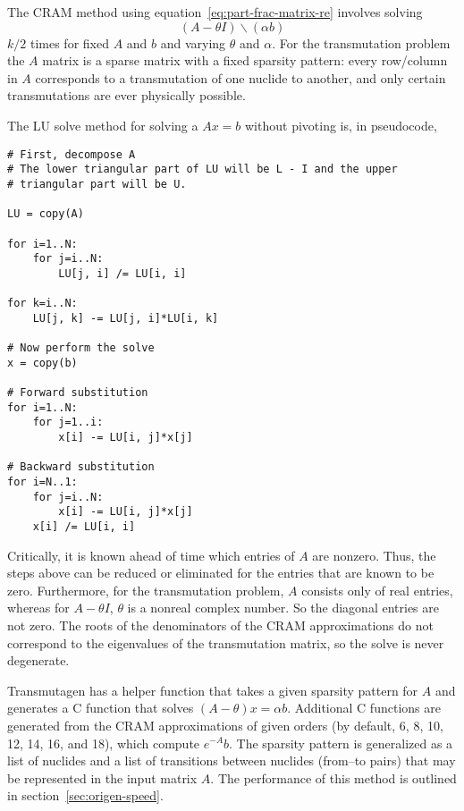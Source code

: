 The CRAM method using equation~\ref{eq:part-frac-matrix-re} involves solving
\begin{equation}
 (A - \theta I)\backslash(\alpha b)
\end{equation}
$k/2$ times for fixed $A$ and $b$ and varying $\theta$ and $\alpha$. For the
transmutation problem the $A$ matrix is a sparse matrix with a fixed sparsity
pattern: every row/column in $A$ corresponds to a transmutation of one nuclide
to another, and only certain transmutations are ever physically possible.

The LU solve method for solving a $Ax=b$ without pivoting is, in pseudocode,

\begin{verbatim}
# First, decompose A
# The lower triangular part of LU will be L - I and the upper
# triangular part will be U.

LU = copy(A)

for i=1..N:
    for j=i..N:
        LU[j, i] /= LU[i, i]

for k=i..N:
    LU[j, k] -= LU[j, i]*LU[i, k]

# Now perform the solve
x = copy(b)

# Forward substitution
for i=1..N:
    for j=1..i:
        x[i] -= LU[i, j]*x[j]

# Backward substitution
for i=N..1:
    for j=i..N:
        x[i] -= LU[i, j]*x[j]
    x[i] /= LU[i, i]
\end{verbatim}

Critically, it is known ahead of time which entries of $A$ are nonzero. Thus,
the steps above can be reduced or eliminated for the entries that are known to
be zero. Furthermore, for the transmutation problem, $A$ consists only of real
entries, whereas for $A - \theta I$, $\theta$ is a nonreal complex number. So
the diagonal entries are not zero. The roots of the denominators of the CRAM
approximations do not correspond to the eigenvalues of the transmutation
matrix, so the solve is never degenerate.

Transmutagen has a helper function that takes a given sparsity pattern for $A$
and generates a C function that solves $(A - \theta)x =\alpha b$. Additional C
functions are generated from the CRAM approximations of given orders (by
default, 6, 8, 10, 12, 14, 16, and 18), which compute $e^{-A}b$. The sparsity
pattern is generalized as a list of nuclides and a list of transitions between
nuclides (from--to pairs) that may be represented in the input matrix $A$. The
performance of this method is outlined in section~\ref{sec:origen-speed}.
